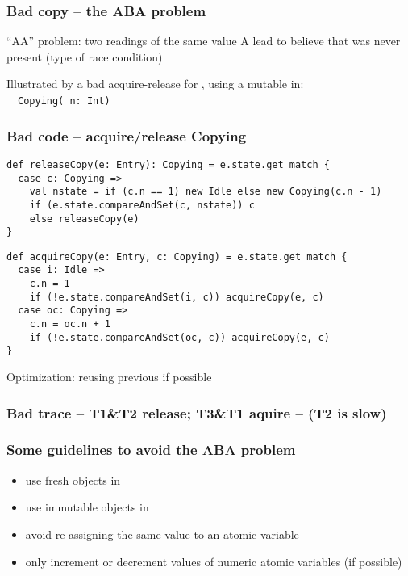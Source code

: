 \documentclass[aspectratio=169]{beamer}
\begin{document}
\begin{frame}\frametitle{Bad copy -- the ABA problem}
\alert{``AA'' problem}: two readings of the same value \alert{A} lead to believe that  was never present (type of race condition)

\bigskip

Illustrated by a bad acquire-release for , using a mutable  in:
\\~~\alert{\texttt{Copying( n: Int)}}
\end{frame}


\begin{frame}[fragile]\frametitle{Bad code -- acquire/release Copying}
    
\begin{lstlisting}[emph={execute,sleep,log,logMessage,compareAndSet,releaseCopy}]
def releaseCopy(e: Entry): Copying = e.state.get match {
  case c: Copying =>
    val nstate = if (c.n == 1) new Idle else new Copying(c.n - 1)
    if (e.state.compareAndSet(c, nstate)) c
    else releaseCopy(e)
}
\end{lstlisting}
\begin{lstlisting}[emph={execute,sleep,log,logMessage,compareAndSet,acquireCopy}]
def acquireCopy(e: Entry, c: Copying) = e.state.get match {
  case i: Idle =>
    c.n = 1
    if (!e.state.compareAndSet(i, c)) acquireCopy(e, c)
  case oc: Copying =>
    c.n = oc.n + 1
    if (!e.state.compareAndSet(oc, c)) acquireCopy(e, c)
}
\end{lstlisting}
Optimization: reusing previous  if possible
\end{frame}


\begin{frame}\frametitle{Bad trace -- T1\&T2 release; T3\&T1 aquire -- (T2 is slow)}
\end{frame}


\begin{frame}\frametitle{Some guidelines to avoid the ABA problem}
  \begin{itemize}
    \item use fresh objects in 
    \item use immutable objects in 
    \item avoid re-assigning the same value to an atomic variable
    \item only increment or decrement values of numeric atomic variables (if possible)
  \end{itemize}


\end{frame}
\end{document}
